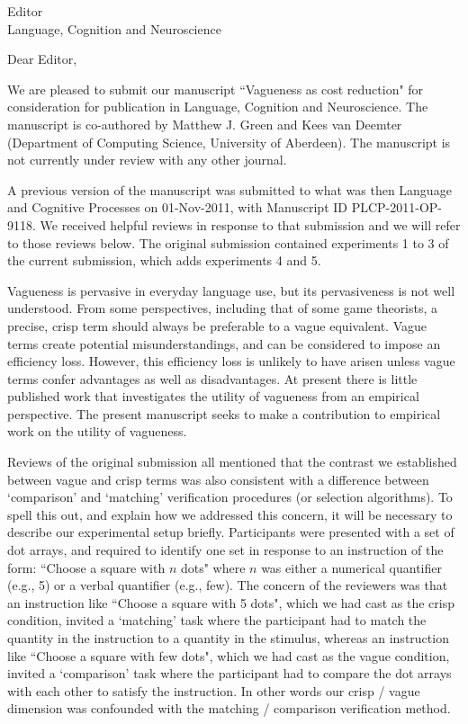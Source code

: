 \documentclass{letter}
\begin{document}
\begin{letter}{Editor\\
Language, Cognition and Neuroscience}


\opening{Dear Editor,}

We are pleased to submit our manuscript ``Vagueness as cost reduction" for consideration for publication in Language, Cognition and Neuroscience. The manuscript is co-authored by Matthew J. Green and Kees van Deemter (Department of Computing Science, University of Aberdeen). The manuscript is not currently under review with any other journal.

A previous version of the manuscript was submitted to what was then Language and Cognitive Processes on 01-Nov-2011, with Manuscript ID PLCP-2011-OP-9118. We received helpful reviews in response to that submission and we will refer to those reviews below. The original submission contained experiments 1 to 3 of the current submission, which adds experiments 4 and 5.

Vagueness is pervasive in everyday language use, but its pervasiveness  is not well understood. From some perspectives, including that of some game theorists, a precise, crisp term should always be preferable to a vague equivalent. Vague terms create potential misunderstandings, and can be considered to impose an efficiency loss. However, this efficiency loss is unlikely to have arisen unless vague terms confer advantages as well as disadvantages. At present there is little published work that investigates the utility of vagueness from an empirical perspective. The present manuscript seeks to make a contribution to empirical work on the utility of vagueness.

Reviews of the original submission all mentioned that the contrast we established between vague and crisp terms was also consistent with a difference between `comparison' and `matching' verification procedures (or selection algorithms). To spell this out, and explain how we addressed this concern, it will be necessary to describe our experimental setup briefly. Participants were presented with a set of dot arrays, and required to identify one set in response to an instruction of the form: ``Choose a square with $n$ dots" where $n$ was either a numerical quantifier (e.g., 5) or a verbal quantifier (e.g., few).  The concern of the reviewers was that an instruction like ``Choose a square with 5 dots", which we had cast as the crisp condition, invited a `matching' task where the participant had to match the quantity in the instruction to a quantity in the stimulus, whereas an instruction like ``Choose a square with few dots", which we had cast as the vague condition, invited a `comparison' task where the participant had to compare the dot arrays with each other to satisfy the instruction. In other words our crisp / vague dimension was confounded with the matching / comparison verification method.


\end{letter}
\end{document}
